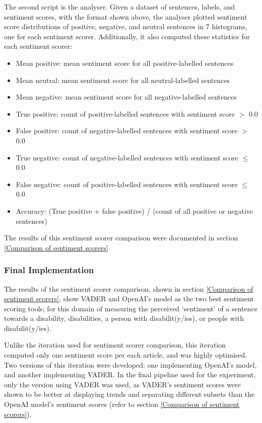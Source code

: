 \documentclass{report}
\begin{document}
The second script is the analyser.
Given a dataset of sentences, labels, and sentiment scores, with the format shown above, the analyser plotted sentiment score distributions of positive, negative, and neutral sentences in 7 histograms, one for each sentiment scorer.
Additionally, it also computed these statistics for each sentiment scorer:
\begin{itemize}
	\item Mean positive: mean sentiment score for all positive-labelled sentences
	\item Mean neutral: mean sentiment score for all neutral-labelled sentences
	\item Mean negative: mean sentiment score for all negative-labelled sentences
	\item True positive: count of positive-labelled sentences with sentiment score $>$ 0.0
	\item False positive: count of negative-labelled sentences with sentiment score $>$ 0.0 
	\item True negative: count of negative-labelled sentences with sentiment score $\le$ 0.0
	\item False negative: count of positive-labelled sentences with sentiment score $\le$ 0.0
	\item Accuracy: (True positive + false positive) / (count of all positive or negative sentences)
\end{itemize}
The results of this sentiment scorer comparison were documented in section \ref{Comparison of sentiment scorers}.

\subsubsection{Final Implementation} \label{des-sentiment-final}

The results of the sentiment scorer comparison, shown in section \ref{Comparison of sentiment scorers}, show VADER \cite{VADER} and OpenAI's model \cite{OpenAI} as the two best sentiment scoring tools; for this domain of measuring the perceived `sentiment' of a sentence towards a disability, disabilities, a person with disabilit(y/ies), or people with disabilit(y/ies).

Unlike the iteration used for sentiment scorer comparison, this iteration computed only one sentiment score per each article, and was highly optimised.
Two versions of this iteration were developed: one implementing OpenAI's model, and another implementing VADER.
In the final pipeline used for the experiment, only the version using VADER was used, as VADER's sentiment scores were shown to be better at displaying trends and separating different subsets than the OpenAI model's sentiment scores (refer to section \ref{Comparison of sentiment scorers}).
\end{document}

